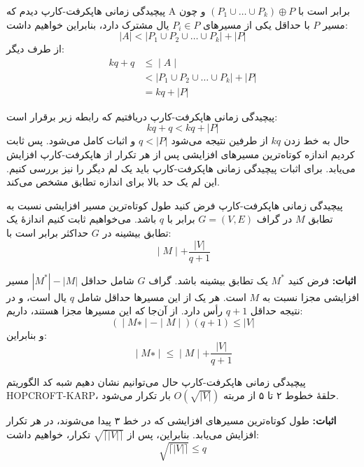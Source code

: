 \begin{itemframe}{‌پیچیدگی زمانی هاپکرفت-کارپ}
\itm
دیدم که A برابر است با
$
(P_1 \cup \dots \cup P_k) \oplus P
$
و چون مسیر $P$ با حداقل یکی از مسیرهای $P_i \in P$ یال مشترک دارد، بنابراین خواهیم داشت:
$$
|A| < |P_1 \cup P_2 \cup \dots \cup P_k| + |P|
$$
از طرف دیگر:
\begin{align*}
kq+q & ≤∣A∣\\
& < |P_1 \cup P_2 \cup \dots \cup P_k| + |P|\\
& = kq + |P|
\end{align*}

\end{itemframe}

\begin{itemframe}{‌پیچیدگی زمانی هاپکرفت-کارپ}
\itm
دریافتیم که رابطه زیر برقرار است:
$$
kq+q  < kq + |P|
$$
\itm
حال به خط زدن $kq$ از طرفین نتیجه می‌شود
$q < |P|$
و اثبات کامل می‌شود. پس ثابت کردیم اندازه کوتاه‌ترین مسیرهای افزایشی پس از هر تکرار از هاپکرفت-کارپ افزایش می‌یابد.
\itm
برای اثبات پیچیدگی زمانی هاپکرفت-کارپ باید یک لم دیگر را نیز بررسی کنیم. این لم یک حد بالا برای اندازه تطابق مشخص می‌کند.
\end{itemframe}

\begin{itemframe}{‌پیچیدگی زمانی هاپکرفت-کارپ}
\decLineSpace[0mm]
\itm
فرض کنید طول کوتاه‌ترین مسیر افزایشی نسبت به تطابق $M$ در گراف $G = (V, E)$ برابر با $q$ باشد. می‌خواهیم ثابت کنیم اندازهٔ یک تطابق بیشینه در $G$ حداکثر برابر است با:
$$∣M∣+ \frac{ |V|}{q + 1}$$

\itm
\textbf{اثبات:}
فرض کنید $M^*$ یک تطابق بیشینه باشد. گراف $G$ شامل حداقل $|M^*| - |M|$ مسیر افزایشی مجزا نسبت به $M$ است.
هر یک از این مسیرها حداقل شامل $q$ یال است، و در نتیجه حداقل
$q + 1$
رأس دارد.
\itm
از آن‌جا که این مسیرها مجزا هستند، داریم:
$$(∣M∗∣−∣M∣)(q+1) \leq |V|$$
و بنابراین:
$$∣M∗∣ \leq∣M∣ + \frac{|V|}{q + 1}$$
\end{itemframe}

\begin{itemframe}{‌پیچیدگی زمانی هاپکرفت-کارپ}
\itm
حال می‌توانیم نشان دهیم شبه کد الگوریتم HOPCROFT-KARP، حلقهٔ خطوط ۲ تا ۵ از مربته $O(\sqrt{|V|})$ بار تکرار می‌شود.

\itm
\textbf{اثبات:}
طول کوتاه‌ترین مسیرهای افزایشی که در خط ۳ پیدا می‌شوند، در هر تکرار افزایش می‌یابد. بنابراین، پس از
$\sqrt{\lceil |V| \rceil}$
تکرار، خواهیم داشت:
$$\sqrt{\lceil |V| \rceil} \leq q$$
\end{itemframe}

